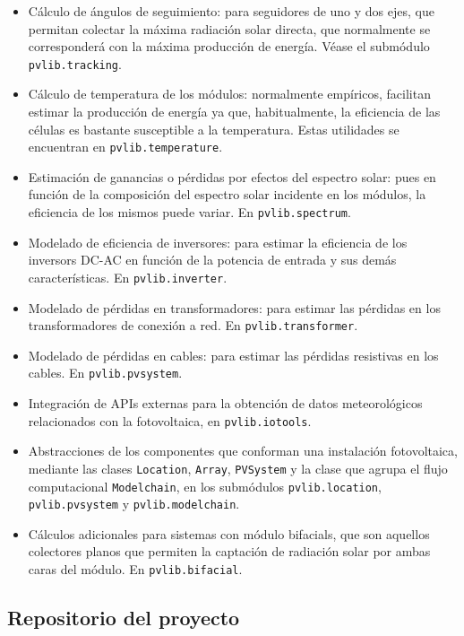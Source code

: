 \begin{itemize}
    \item Cálculo de ángulos de seguimiento: para seguidores de uno y dos ejes, que permitan colectar la máxima radiación solar \gls{directa}, que normalmente se corresponderá con la máxima producción de energía. Véase el submódulo \texttt{pvlib.tracking}.
    \item Cálculo de temperatura de los módulos: normalmente empíricos, facilitan estimar la producción de energía ya que, habitualmente, la eficiencia de las células es bastante susceptible a la temperatura. Estas utilidades se encuentran en \texttt{pvlib.temperature}.
    \item Estimación de ganancias o pérdidas por efectos del espectro solar: pues en función de la composición del espectro solar incidente en los módulos, la eficiencia de los mismos puede variar. En \texttt{pvlib.spectrum}.
    \item Modelado de eficiencia de inversores: para estimar la eficiencia de los \glspl{inversor} DC-AC en función de la potencia de entrada y sus demás características. En \texttt{pvlib.inverter}.
    \item Modelado de pérdidas en transformadores: para estimar las pérdidas en los \gls{transformadores} de conexión a red. En \texttt{pvlib.transformer}.
    \item Modelado de pérdidas en cables: para estimar las pérdidas resistivas en los cables. En \texttt{pvlib.pvsystem}.
    \item Integración de APIs externas para la obtención de datos meteorológicos relacionados con la fotovoltaica, en \texttt{pvlib.iotools}.
    \item Abstracciones de los componentes que conforman una instalación fotovoltaica, mediante las clases \texttt{Location}, \texttt{Array}, \texttt{PVSystem} y la clase que agrupa el flujo computacional \texttt{Modelchain}, en los submódulos \texttt{pvlib.location}, \texttt{pvlib.pvsystem} y \texttt{pvlib.modelchain}.
    \item Cálculos adicionales para sistemas con \glspl{módulo bifacial}, que son aquellos \gls{colectores} planos que permiten la captación de radiación solar por ambas caras del módulo. En \texttt{pvlib.bifacial}.

\end{itemize}

\subsection{Repositorio del proyecto} \label{ssct:pvlib:repositorio}

